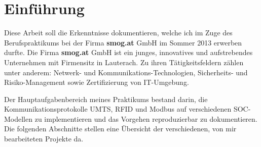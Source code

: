 \documentclass[Bachelorarbeit.tex]{subfiles}
\begin{document}
\chapter{Einführung}

Diese Arbeit soll die Erkenntnisse dokumentieren, welche ich im Zuge des Berufspraktikums  bei der Firma \textbf{smog.at} GmbH im Sommer 2013 erwerben durfte.
Die Firma \textbf{smog.at} GmbH ist ein junges, innovatives und aufstrebendes Unternehmen mit Firmensitz in Lauterach. Zu ihren Tätigkeitsfeldern zählen unter anderem: Netwerk- und Kommunikations-Technologien, Sicherheits- und Risiko-Management sowie Zertifizierung von IT-Umgebung.\\
\begin{comment}
Der Hauptaufgabenbereich meines Praktikums bestand darin, verschiedene Kommunikationskanäle wie beispielsweise \acf{UMTS}, \acf{RFID} und Modbus auf verschiedenen \acf{SOC}-Modellen zu implementieren und das Vorgehen reproduzierbar zu dokumentieren.
\end{comment}
Der Hauptaufgabenbereich meines Praktikums bestand darin, die Kommunikationsprotokolle \acf{UMTS}, \acf{RFID} und Modbus auf verschiedenen \acf{SOC}-Modellen zu implementieren und das Vorgehen reproduzierbar zu dokumentieren.
 Die folgenden Abschnitte stellen eine Übersicht der verschiedenen, von mir bearbeiteten Projekte da.
\end{document}

